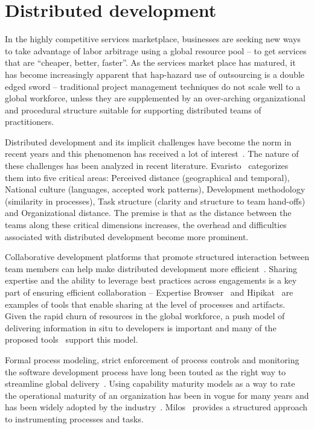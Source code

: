 \section{Distributed development}
In the highly competitive services marketplace, businesses are seeking new ways to take advantage of labor arbitrage using a global resource pool -- to get services that are ``cheaper, better, faster''.  As the services market place has matured, it has become increasingly apparent that hap-hazard use of outsourcing is a double edged sword -- traditional project management techniques do not scale well to a global workforce, unless they are supplemented by an over-arching organizational and procedural structure suitable for supporting distributed teams of practitioners.

Distributed development and its implicit challenges have become the norm in recent years and this phenomenon has received a lot of interest~\cite{glo24,glo26}. The nature of these challenges has been analyzed in recent literature. Evaristo~\cite{glo27} categorizes them into five critical areas: Perceived distance (geographical and temporal), National culture (languages, accepted work patterns), Development methodology (similarity in processes), Task structure (clarity and structure to team hand-offs) and Organizational distance. The premise is that as the distance between the teams along these critical dimensions increases, the overhead and difficulties associated with distributed development become more prominent.

Collaborative development platforms that promote structured interaction between team members can help make distributed development more efficient~\cite{glo28,glo29}. Sharing expertise and the ability to leverage best practices across engagements is a key part of ensuring efficient collaboration – Expertise Browser~\cite{glo30} and Hipikat~\cite{glo31} are examples of tools that enable sharing at the level of processes and artifacts. Given the rapid churn of resources in the global workforce, a push model of delivering information in situ to developers is important and many of the proposed tools~\cite{glo29,glo31,glo34} support this model.

Formal process modeling, strict enforcement of process controls and monitoring the software development process have long been touted as the right way to streamline global delivery~\cite{glo32,glo33,glo34}. Using capability maturity models as a way to rate the operational maturity of an organization has been in vogue for many years and has been widely adopted by the industry~\cite{glo35}. Milos~\cite{glo34} provides a structured approach to instrumenting processes and tasks.

